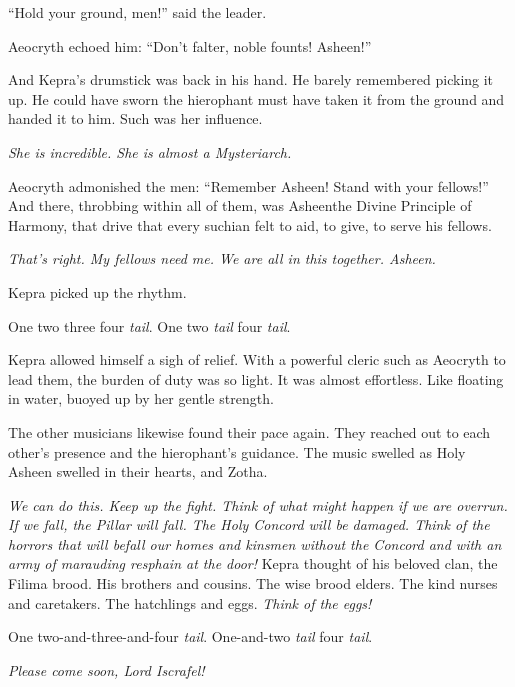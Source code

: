 \documentclass
  [a4paper,
   12pt,
   oneside
  ]%
  {article}
\newcommand{\drum}[1]{\textsf{#1}}
\begin{document}
``Hold your ground, men!'' said the leader.

Aeocryth echoed him: ``Don’t falter, noble founts! Asheen!''

And Kepra's drumstick was back in his hand. He barely remembered picking it up. 
He could have sworn the hierophant must have taken it from the ground and handed it to him. Such was her influence. 

\emph{She is incredible. She is almost a Mysteriarch.}

Aeocryth admonished the men: ``Remember Asheen! Stand with your fellows!''
And there, throbbing within all of them, was Asheen\dash{}the Divine Principle of Harmony, that drive that every suchian felt to aid, to give, to serve his fellows.

\emph{That's right. My fellows need me. We are all in this together. Asheen.}

Kepra picked up the rhythm.

\drum{One two three four \emph{tail}. One two \emph{tail} four \emph{tail}.}

Kepra allowed himself a sigh of relief.
With a powerful cleric such as Aeocryth to lead them, the burden of duty was so light. 
It was almost effortless. 
Like floating in water, buoyed up by her gentle strength.

The other musicians likewise found their pace again. 
They reached out to each other’s presence and the hierophant’s guidance. 
The music swelled as Holy Asheen swelled in their hearts, and Zotha.

\emph{
    We can do this.
    Keep up the fight. Think of what might happen if we are overrun. If we fall, the Pillar will fall. The Holy Concord will be damaged. 
    Think of the horrors that will befall our homes and kinsmen without the Concord and with an army of marauding resphain at the door!%
} 
Kepra thought of his beloved clan, the Filima brood. His brothers and cousins. The wise brood elders. The kind nurses and caretakers. The hatchlings and eggs. 
\emph{Think of the eggs!}

\drum{One two-and-three-and-four \emph{tail}. One-and-two \emph{tail} four \emph{tail}.}

\emph{Please come soon, Lord Iscrafel!}
\end{document}
